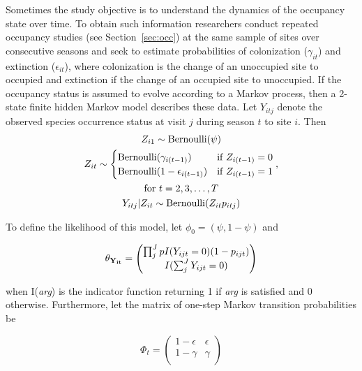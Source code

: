 \documentclass[article,shortnames]{jss}
\DeclareMathOperator{\Bern}{Bernoulli}
\begin{document}
Sometimes the study objective is to understand the dynamics of the 
occupancy state over time. To obtain such information researchers conduct 
repeated occupancy studies (see Section~\ref{sec:occ}) at the same sample of 
sites over consecutive seasons \citep{MacKenzie2003} and seek to estimate
probabilities of colonization ($\gamma_{it}$) and extinction
($\epsilon_{it}$), where colonization is the change of an unoccupied
site to occupied and extinction if the change of an occupied site to
unoccupied.  If the occupancy status is assumed to evolve according to
a Markov process, then a 2-state finite hidden Markov model describes
these data.  Let $Y_{itj}$ denote the observed species occurrence
status at visit $j$ during season $t$ to site $i$.  Then
\begin{gather}
  Z_{i1} \sim \Bern(\psi) \\
  Z_{it} \sim
  \begin{cases}
    \Bern(\gamma_{i(t-1)}) & \text{if $Z_{i(t-1)} = 0$} \\
    \Bern(1-\epsilon_{i(t-1)}) & \text{if $Z_{i(t-1)} = 1$}
  \end{cases}, \\
  \text{for $t=2,3,\dots,T$} \notag \\
  Y_{itj} | Z_{it} \sim \Bern(Z_{it} p_{itj})
\end{gather}

To define the likelihood of this model, let $\phi_0 = (\psi, 1-\psi)$ and 

\begin{equation}
  \theta_{{\bf Y_{it}}} =
  \begin{pmatrix}
    \prod_{j}^{J} p I(Y_{ijt}=0)(1-p_{ijt}) \\
    I(\sum_{j}^{J} Y_{ijt}=0) \\
  \end{pmatrix}
\end{equation}

when I({\it arg}) is the indicator function returning 1 if {\it arg} is 
satisfied and 0 otherwise. Furthermore, let  the matrix of one-step Markov 
transition probabilities be 

\begin{equation}
  \Phi_t =
  \begin{pmatrix}
    1-\epsilon & \epsilon \\
    1-\gamma & \gamma\\
  \end{pmatrix}
\end{equation}
\end{document}
